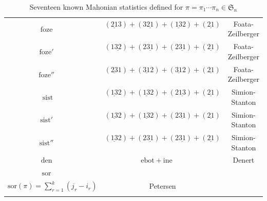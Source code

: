\documentclass[12pt]{amsart}
\makeatletter
\newcommand{\tabincell}[2]{\begin{tabular}{@{}#1@{}}#2\end{tabular}}
\numberwithin{equation}{section}
\theoremstyle{plain}
\theoremstyle{definition}
\def\SS{\mathfrak{S}}
\def\ine{\mathrm{ine}}
\def\ebot{\mathrm{ebot}}
\def\den{\mathrm{den}}
\def\foze{\mathrm{foze}}
\def\sist{\mathrm{sist}}
\def\sort{\mathrm{sor}}
\def\sist{\mathrm{sist}}
\makeatother
\begin{document}
\begin{table}[htb]
{\begin{tabular*}{5in}{ccc}
 $\foze$ \,\,\,\,\,\,\,\,& $(\underline{21}3)+(3\underline{21})+(\underline{13}2)+(\underline{21})$ \,\,\,\,\,\,\,\,& Foata-Zeilberger \cite{FZ01}\\\vspace{4pt}

 $\foze'$ \,\,\,\,\,\,\,\,& $(1\underline{32})+(2\underline{31})+(2\underline{31})+(\underline{21})$ \,\,\,\,\,\,\,\,& Foata-Zeilberger \cite{FZ01}\\\vspace{4pt}


  $\foze''$ \,\,\,\,\,\,\,\,& $(\underline{23}1)+(\underline{31}2)+(\underline{31}2)+(\underline{21})$ \,\,\,\,\,\,\,\,& Foata-Zeilberger \cite{FZ01} \\\vspace{4pt}

  $\sist$\,\,\,\,\,\,\,\, & $(\underline{13}2)+(\underline{13}2)+(2\underline{13})+(\underline{21})$ \,\,\,\,\,\,\,\,& Simion-Stanton \cite{SS}\\\vspace{4pt}

  $\sist'$ \,\,\,\,\,\,\,\,& $(\underline{13}2)+(\underline{13}2)+(2\underline{31})+(\underline{21})$ \,\,\,\,\,\,\,\,& Simion-Stanton \cite{SS}\\\vspace{4pt}

  $\sist''$ \,\,\,\,\,\,\,\,& $(\underline{13}2)+(2\underline{31})+(2\underline{31})+(\underline{21})$ \,\,\,\,\,\,\,\,& Simion-Stanton \cite{SS}\\\vspace{4pt}

  $\den$ \,\,\,\,\,\,\,\,& $\ebot+\ine$ \,\,\,\,\,\,\,\,& Denert \cite{Den}\\\vspace{4pt}

  $\sort$ \,\,\,\,\,\,\,\,&
  \tabincell{c}{\small{$\pi=(i_1,j_1)(i_2,j_2)\cdots (i_k,j_k),$}\\
  \small{$\sort(\pi)=\sum_{r=1}^{k}(j_r-i_r)$}}
  \,\,\,\,\,\,\,\,& Petersen \cite{P}\\

\bottomrule\\
\end{tabular*}
}
\caption{Seventeen known Mahonian statistics defined for $\pi=\pi_1\cdots\pi_n\in\SS_n$}\label{known Mahonian stats}
\end{table}
\end{document}
